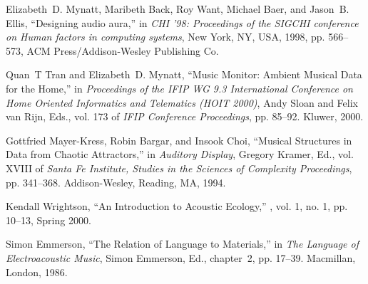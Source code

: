 \documentclass{article}
\begin{document}
\begin{thebibliography}{10}
Elizabeth~D. Mynatt, Maribeth Back, Roy Want, Michael Baer, and Jason~B. Ellis,
\newblock ``Designing audio aura,''
\newblock in {\em CHI '98: Proceedings of the SIGCHI conference on Human
  factors in computing systems}, New York, NY, USA, 1998, pp. 566--573, ACM
  Press/Addison-Wesley Publishing Co.

Quan~T Tran and Elizabeth~D. Mynatt,
\newblock ``Music Monitor: Ambient Musical Data for the Home,''
\newblock in {\em Proceedings of the IFIP WG 9.3 International Conference on
  Home Oriented Informatics and Telematics (HOIT 2000)}, Andy Sloan and Felix
  van Rijn, Eds., vol. 173 of {\em IFIP Conference Proceedings}, pp. 85--92.
  Kluwer, 2000.

Gottfried Mayer-Kress, Robin Bargar, and Insook Choi,
\newblock ``Musical Structures in Data from Chaotic Attractors,''
\newblock in {\em Auditory Display}, Gregory Kramer, Ed., vol. XVIII of {\em
  Santa Fe Institute, Studies in the Sciences of Complexity Proceedings}, pp.
  341--368. Addison-Wesley, Reading, MA, 1994.

Kendall Wrightson,
\newblock ``An Introduction to Acoustic Ecology,''
, vol. 1, no. 1, pp.
  10--13, Spring 2000.

Simon Emmerson,
\newblock ``The Relation of Language to Materials,''
\newblock in {\em The Language of Electroacoustic Music}, Simon Emmerson, Ed.,
  chapter~2, pp. 17--39. Macmillan, London, 1986.

\end{thebibliography}
\end{document}
